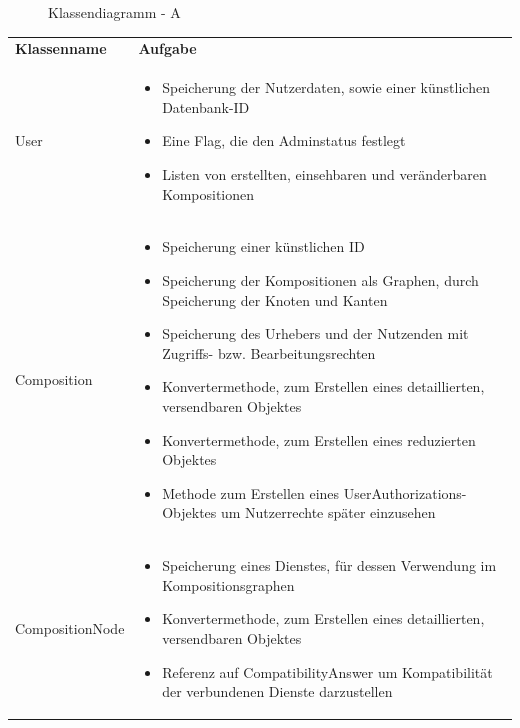 \makeatletter
\newcommand*{\compress}{\@minipagetrue}
\makeatother

\begin{figure}[h]
	\centering
	\caption{Klassendiagramm - A}
	\label{fig:klassendiagramm-a}
\end{figure}

\begin{table}[h]
	\centering
	\begin{tabularx}{\textwidth}{p{} | X}
		\rowcolor[HTML]{C0C0C0}
		\textbf{Klassenname} & \textbf{Aufgabe} \\
		User & \compress \begin{itemize}
			\item Speicherung der Nutzerdaten, sowie einer künstlichen Datenbank-ID
			\item Eine Flag, die den Adminstatus festlegt
			\item Listen von erstellten, einsehbaren und veränderbaren Kompositionen
		\end{itemize}\\
		\rowcolor[HTML]{E7E7E7}
		Composition & \compress \begin{itemize}
		  \item Speicherung einer künstlichen ID
			\item Speicherung der Kompositionen als Graphen, durch Speicherung der Knoten und Kanten
			\item Speicherung des Urhebers und der Nutzenden mit Zugriffs- bzw. Bearbeitungsrechten
			\item Konvertermethode, zum Erstellen eines detaillierten, versendbaren Objektes
			\item Konvertermethode, zum Erstellen eines reduzierten Objektes
			\item Methode zum Erstellen eines UserAuthorizations-Objektes um Nutzerrechte später einzusehen
		\end{itemize} \\
		CompositionNode & \compress \begin{itemize}
			\item Speicherung eines Dienstes, für dessen Verwendung im Kompositionsgraphen
			\item Konvertermethode, zum Erstellen eines detaillierten, versendbaren Objektes
			\item Referenz auf CompatibilityAnswer um Kompatibilität der verbundenen Dienste darzustellen
		\end{itemize} \\

\end{tabularx}
\end{table}
